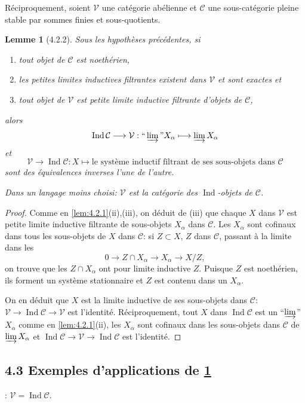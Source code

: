 \documentclass[12pt,a4paper]{article}
\theoremstyle{plain}
\newtheorem{lemma}[theorem]{Lemme}
\theoremstyle{definition}
\theoremstyle{remark}
\DeclareMathOperator{\Ind}{Ind}
\providecommand{\limind}{\varinjlim}
\begin{document}
R\'eciproquement, soient $\mathcal{V}$ une cat\'egorie ab\'elienne et $\mathcal{C}$ une
sous-cat\'egorie pleine stable par sommes finies et sous-quotients.

\begin{lemma}[4.2.2]\label{lem:4.2.2}
Sous les hypoth\`eses pr\'ec\'edentes, si
\begin{enumerate}[label=(\roman*)]
\item tout objet de $\mathcal{C}$ est noeth\'erien,
\item les petites limites inductives filtrantes existent dans $\mathcal{V}$ et sont exactes
et
\item tout objet de $\mathcal{V}$ est petite limite inductive filtrante d'objets de
$\mathcal{C}$,
\end{enumerate}
alors
\[
\Ind\mathcal{C} \longrightarrow \mathcal{V}:
\text{``}\limind\text{''} X_\alpha \longmapsto \limind X_\alpha
\]
et
\[
\mathcal{V} \longrightarrow \Ind\mathcal{C}: X \longmapsto \text{le syst\`eme
inductif filtrant de ses sous-objets dans } \mathcal{C}
\]
sont des \'equivalences inverses l'une de l'autre.

Dans un langage moins choisi: $\mathcal{V}$ est la cat\'egorie des $\Ind$-objets de
$\mathcal{C}$.
\end{lemma}

\begin{proof}
Comme en \ref{lem:4.2.1}(ii),(iii), on d\'eduit de (iii) que chaque $X$ dans
$\mathcal{V}$ est petite limite inductive filtrante de sous-objets $X_\alpha$ dans
$\mathcal{C}$. Les $X_\alpha$ sont cofinaux dans tous les sous-objets de $X$ dans
$\mathcal{C}$: si $Z \subset X$, $Z$ dans $\mathcal{C}$, passant \`a la limite dans les
\[
0 \longrightarrow Z \cap X_\alpha \longrightarrow X_\alpha \longrightarrow X/Z,
\]
on trouve que les $Z \cap X_\alpha$ ont pour limite inductive $Z$. Puisque $Z$ est
noeth\'erien, ils forment un syst\`eme stationnaire et $Z$ est contenu dans un
$X_\alpha$.

On en d\'eduit que $X$ est la limite inductive de ses sous-objets dans $\mathcal{C}$:
$\mathcal{V} \to \Ind\mathcal{C} \to \mathcal{V}$ est l'identit\'e. R\'eciproquement, tout
$X$ dans $\Ind\mathcal{C}$ est un ``$\limind$'' $X_\alpha$ comme en
\ref{lem:4.2.1}(ii), les $X_\alpha$ sont cofinaux dans les sous-objets dans
$\mathcal{C}$ de $\limind X_\alpha$ et $\Ind\mathcal{C} \to \mathcal{V} \to
\Ind\mathcal{C}$ est l'identit\'e.
\end{proof}

\subsection*{4.3 Exemples d'applications de \ref{lem:4.2.2}}:
$\mathcal{V} = \Ind\mathcal{C}$.
\end{document}
